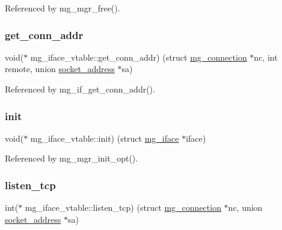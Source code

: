 Referenced by mg\+\_\+mgr\+\_\+free().

\mbox{\label{structmg__iface__vtable_a7b83f83b265b8d10bb85fafd726aab9d_a7b83f83b265b8d10bb85fafd726aab9d}} 
\subsubsection{\texorpdfstring{get\+\_\+conn\+\_\+addr}{get\_conn\_addr}}
{\footnotesize\ttfamily void($\ast$ mg\+\_\+iface\+\_\+vtable\+::get\+\_\+conn\+\_\+addr) (struct \hyperlink{structmg__connection}{mg\+\_\+connection} $\ast$nc, int remote, union \hyperlink{unionsocket__address}{socket\+\_\+address} $\ast$sa)}



Referenced by mg\+\_\+if\+\_\+get\+\_\+conn\+\_\+addr().

\mbox{\label{structmg__iface__vtable_a66915ed7fbcef057c33bb6dfa3d8a8ee_a66915ed7fbcef057c33bb6dfa3d8a8ee}} 
\subsubsection{\texorpdfstring{init}{init}}
{\footnotesize\ttfamily void($\ast$ mg\+\_\+iface\+\_\+vtable\+::init) (struct \hyperlink{structmg__iface}{mg\+\_\+iface} $\ast$iface)}



Referenced by mg\+\_\+mgr\+\_\+init\+\_\+opt().

\mbox{\label{structmg__iface__vtable_a8b75b7e0f1ebd12f00580756ffdbda28_a8b75b7e0f1ebd12f00580756ffdbda28}} 
\subsubsection{\texorpdfstring{listen\+\_\+tcp}{listen\_tcp}}
{\footnotesize\ttfamily int($\ast$ mg\+\_\+iface\+\_\+vtable\+::listen\+\_\+tcp) (struct \hyperlink{structmg__connection}{mg\+\_\+connection} $\ast$nc, union \hyperlink{unionsocket__address}{socket\+\_\+address} $\ast$sa)}



